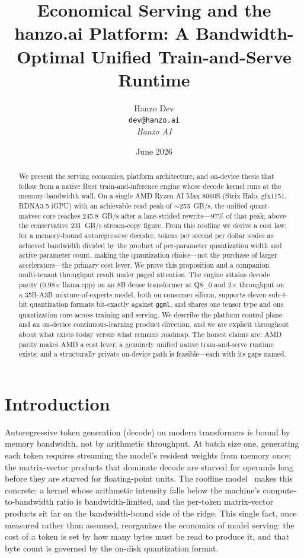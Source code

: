 \documentclass[11pt]{article}
\title{Economical Serving and the hanzo.ai Platform: A Bandwidth-Optimal Unified Train-and-Serve Runtime}
\author{Hanzo Dev \\ \texttt{dev@hanzo.ai} \\ \textit{Hanzo AI}}
\date{June 2026}
\begin{document}
\hanzocoverpage

\begin{abstract}
We present the serving economics, platform architecture, and on-device thesis that follow from a native Rust train-and-inference engine whose decode kernel runs at the memory-bandwidth wall. On a single AMD Ryzen AI Max 8060S (Strix Halo, gfx1151, RDNA3.5 iGPU) with an achievable read peak of $\sim$253~GB/s, the unified quant-matvec core reaches 245.8~GB/s after a lane-strided rewrite---$97\%$ of that peak, above the conservative 231~GB/s stream-copy figure. From this roofline we derive a cost law: for a memory-bound autoregressive decoder, tokens per second per dollar scales as achieved bandwidth divided by the product of per-parameter quantization width and active parameter count, making the quantization choice---not the purchase of larger accelerators---the primary cost lever. We prove this proposition and a companion multi-tenant throughput result under paged attention. The engine attains decode parity (0.98$\times$ llama.cpp) on an 8B dense transformer at Q8\_0 and 2$\times$ throughput on a 35B-A3B mixture-of-experts model, both on consumer silicon, supports eleven sub-4-bit quantization formats bit-exactly against \texttt{ggml}, and shares one tensor type and one quantization core across training and serving. We describe the platform control plane and an on-device continuous-learning product direction, and we are explicit throughout about what exists today versus what remains roadmap. The honest claims are: AMD parity makes AMD a cost lever; a genuinely unified native train-and-serve runtime exists; and a structurally private on-device path is feasible---each with its gaps named.
\end{abstract}

\section{Introduction}

Autoregressive token generation (decode) on modern transformers is bound by memory bandwidth, not by arithmetic throughput. At batch size one, generating each token requires streaming the model's resident weights from memory once; the matrix-vector products that dominate decode are starved for operands long before they are starved for floating-point units. The roofline model~\cite{williams2009} makes this concrete: a kernel whose arithmetic intensity falls below the machine's compute-to-bandwidth ratio is bandwidth-limited, and the per-token matrix-vector products sit far on the bandwidth-bound side of the ridge. This single fact, once measured rather than assumed, reorganizes the economics of model serving: the cost of a token is set by how many bytes must be read to produce it, and that byte count is governed by the on-disk quantization format.
\end{document}
